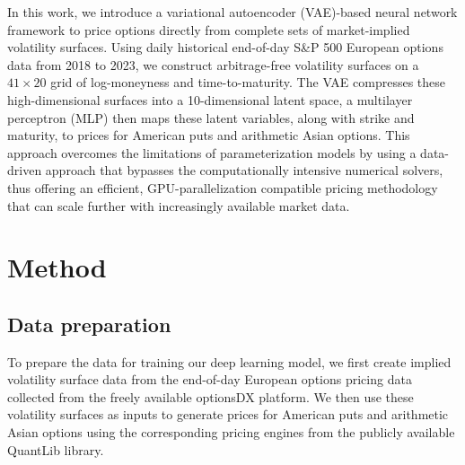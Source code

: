 \documentclass[%
 reprint,
 superscriptaddress,
nobibnotes,
 amsmath,amssymb,
 aip,
]{revtex4-2}
\begin{document}
In this work, we introduce a variational autoencoder (VAE)\cite{doersch2016tutorial,pu2016variational,bergeron2021variational}-based neural network framework to price options directly from complete sets of market-implied volatility surfaces. Using daily historical end-of-day S\&P 500 European options data from 2018 to 2023, we construct arbitrage-free volatility surfaces on a $41\times 20$ grid of log-moneyness and time-to-maturity. The VAE compresses these high-dimensional surfaces into a 10-dimensional latent space, a multilayer perceptron (MLP) then maps these latent variables, along with strike and maturity, to prices for American puts and arithmetic Asian options\cite{vecer2001new}. This approach overcomes the limitations of parameterization models\cite{gatheral2014arbitrage, ding2025fast} by using a data-driven approach that bypasses the computationally intensive numerical solvers, thus offering an efficient, GPU-parallelization compatible pricing methodology that can scale further with increasingly available market data.

\section{Method}
\label{sec:method}

\subsection{Data preparation}
To prepare the data for training our deep learning model, we first create implied volatility surface data from the end-of-day European options pricing data collected from the freely available optionsDX platform. We then use these volatility surfaces as inputs to generate prices for American puts and arithmetic Asian options using the corresponding pricing engines from the publicly available QuantLib library\cite{varma2015derivatives,varma2016computational}.
\end{document}
